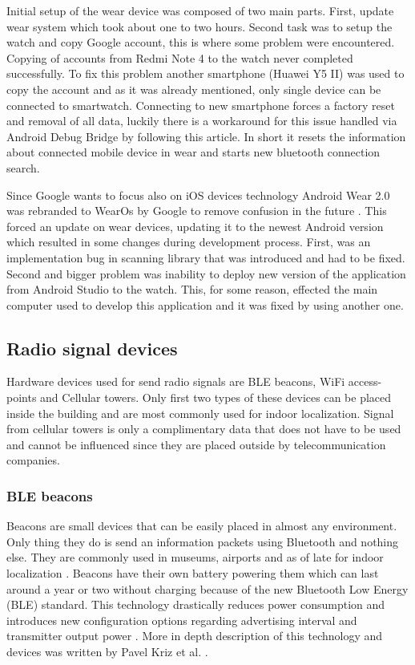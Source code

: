 Initial setup of the wear device was composed of two main parts. First, update wear system which took about one to two hours. Second task was to setup the watch and copy Google account, this is where some problem were encountered. Copying of accounts from Redmi Note 4 to the watch never completed successfully. To fix this problem another smartphone (Huawei Y5 II) was used to copy the account and as it was already mentioned, only single device can be connected to smartwatch. Connecting to new smartphone forces a factory reset and removal of all data, luckily there is a workaround for this issue handled via Android Debug Bridge by following this \cite{HtPAWW} article. In short it resets the information about connected mobile device in wear and starts new bluetooth connection search.

Since Google wants to focus also on iOS devices technology Android Wear 2.0 was rebranded to WearOs by Google to remove confusion in the future \cite{AWITFNM}. This forced an update on wear devices, updating it to the newest Android version which resulted in some changes during development process. First, was an implementation bug in scanning library that was introduced and had to be fixed. Second and bigger problem was inability to deploy new version of the application from Android Studio to the watch. This, for some reason, effected the main computer used to develop this application and it was fixed by using another one.

\subsection{Radio signal devices}\label{subsec:RSD}
Hardware devices used for send radio signals are BLE beacons, WiFi access-points and Cellular towers. Only first two types of these devices can be placed inside the building and are most commonly used for indoor localization. Signal from cellular towers is only a complimentary data that does not have to be used and cannot be influenced since they are placed outside by telecommunication companies.

\subsubsection{BLE beacons}\label{subsec:BLEBeacons}
Beacons are small devices that can be easily placed in almost any environment. Only thing they do is send an information packets using Bluetooth and nothing else. They are commonly used in museums, airports and as of late for indoor localization \cite{10TABB}. Beacons have their own battery powering them which can last around a year or two without charging because of the new Bluetooth Low Energy (BLE) standard. This technology drastically reduces power consumption and introduces new configuration options regarding advertising interval and transmitter output power \cite{IPSBOBLE}. More in depth description of this technology and devices was written by Pavel Kriz et al. \cite{IILUBLEB}.

